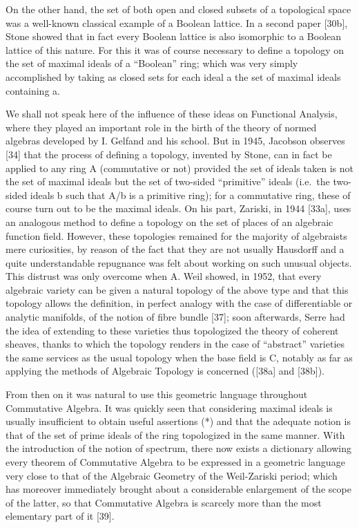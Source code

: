 On the other hand, the set of both open and closed subsets of a topological space was a well-known classical example of a Boolean lattice. In a second paper {[}30b{]}, Stone showed that in fact every Boolean lattice is also isomorphic to a Boolean lattice of this nature. For this it was of course necessary to define a topology on the set of maximal ideals of a ``Boolean'' ring; which was very simply accomplished by taking as closed sets for each ideal a the set of maximal ideals containing a.

We shall not speak here of the influence of these ideas on Functional Analysis, where they played an important role in the birth of the theory of normed algebras developed by I. Gelfand and his school. But in 1945, Jacobson observes {[}34{]} that the process of defining a topology, invented by Stone, can in fact be applied to any ring A (commutative or not) provided the set of ideals taken is not the set of maximal ideals but the set of two-sided ``primitive'' ideals (i.e.~the two-sided ideals b such that A/b is a primitive ring); for a commutative ring, these of course turn out to be the maximal ideals. On his part, Zariski, in 1944 {[}33a{]}, uses an analogous method to define a topology on the set of places of an algebraic function field. However, these topologies remained for the majority of algebraists mere curiosities, by reason of the fact that they are not usually Hausdorff and a quite understandable repugnance was felt about working on such unusual objects. This distrust was only overcome when A. Weil showed, in 1952, that every algebraic variety can be given a natural topology of the above type and that this topology allows the definition, in perfect analogy with the case of differentiable or analytic manifolds, of the notion of fibre bundle {[}37{]}; soon afterwards, Serre had the idea of extending to these varieties thus topologized the theory of coherent sheaves, thanks to which the topology renders in the case of ``abstract'' varieties the same services as the usual topology when the base field is C, notably as far as applying the methods of Algebraic Topology is concerned ({[}38a{]} and {[}38b{]}).

From then on it was natural to use this geometric language throughout Commutative Algebra. It was quickly seen that considering maximal ideals is usually insufficient to obtain useful assertions (*) and that the adequate notion is that of the set of prime ideals of the ring topologized in the same manner. With the introduction of the notion of spectrum, there now exists a dictionary allowing every theorem of Commutative Algebra to be expressed in a geometric language very close to that of the Algebraic Geometry of the Weil-Zariski period; which has moreover immediately brought about a considerable enlargement of the scope of the latter, so that Commutative Algebra is scarcely more than the most elementary part of it {[}39{]}.
\relax{}
